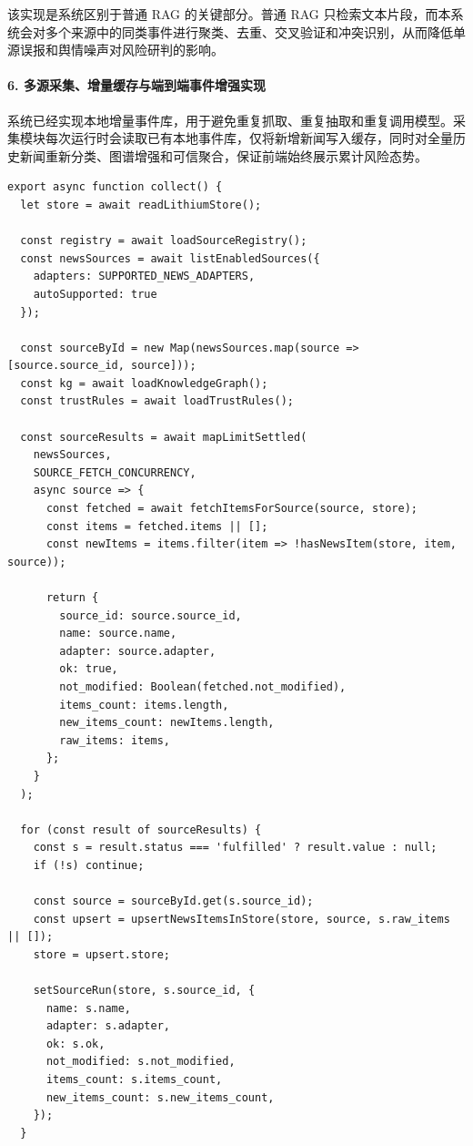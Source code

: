 ﻿\documentclass[12pt,a4paper]{article}
\begin{document}
该实现是系统区别于普通 RAG 的关键部分。普通 RAG 只检索文本片段，而本系统会对多个来源中的同类事件进行聚类、去重、交叉验证和冲突识别，从而降低单源误报和舆情噪声对风险研判的影响。

\paragraph{6. 多源采集、增量缓存与端到端事件增强实现}

系统已经实现本地增量事件库，用于避免重复抓取、重复抽取和重复调用模型。采集模块每次运行时会读取已有本地事件库，仅将新增新闻写入缓存，同时对全量历史新闻重新分类、图谱增强和可信聚合，保证前端始终展示累计风险态势。

\begin{lstlisting}[style=projectcode,caption={多源采集、增量入库、图谱增强与可信聚合流程}]
export async function collect() {
  let store = await readLithiumStore();

  const registry = await loadSourceRegistry();
  const newsSources = await listEnabledSources({
    adapters: SUPPORTED_NEWS_ADAPTERS,
    autoSupported: true
  });

  const sourceById = new Map(newsSources.map(source => [source.source_id, source]));
  const kg = await loadKnowledgeGraph();
  const trustRules = await loadTrustRules();

  const sourceResults = await mapLimitSettled(
    newsSources,
    SOURCE_FETCH_CONCURRENCY,
    async source => {
      const fetched = await fetchItemsForSource(source, store);
      const items = fetched.items || [];
      const newItems = items.filter(item => !hasNewsItem(store, item, source));

      return {
        source_id: source.source_id,
        name: source.name,
        adapter: source.adapter,
        ok: true,
        not_modified: Boolean(fetched.not_modified),
        items_count: items.length,
        new_items_count: newItems.length,
        raw_items: items,
      };
    }
  );

  for (const result of sourceResults) {
    const s = result.status === 'fulfilled' ? result.value : null;
    if (!s) continue;

    const source = sourceById.get(s.source_id);
    const upsert = upsertNewsItemsInStore(store, source, s.raw_items || []);
    store = upsert.store;

    setSourceRun(store, s.source_id, {
      name: s.name,
      adapter: s.adapter,
      ok: s.ok,
      not_modified: s.not_modified,
      items_count: s.items_count,
      new_items_count: s.new_items_count,
    });
  }


\end{lstlisting}
\end{document}

